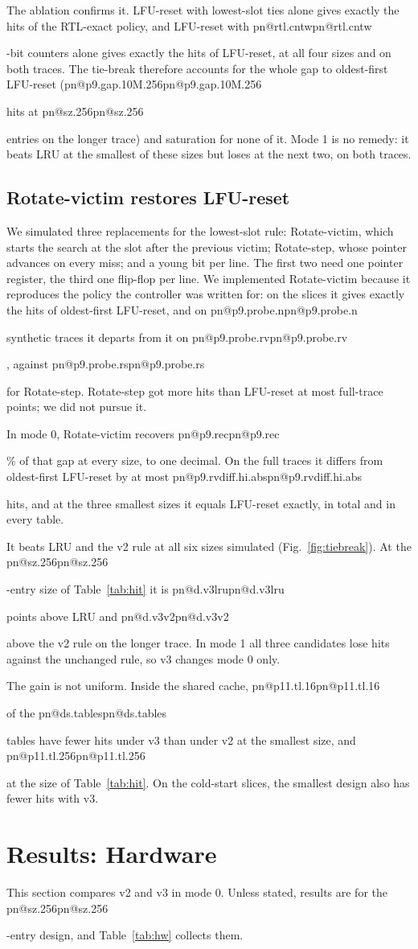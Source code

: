 \documentclass[conference,10pt]{IEEEtran}
\makeatletter
\newcommand{\R}[1]{\ifcsname pn@#1\endcsname\csname pn@#1\endcsname\else
  \PackageError{paper}{number key '#1' is not defined in macros.tex}{Run tools/make_paper_macros.py}\fi}
\makeatother
\begin{document}
The ablation confirms it. LFU-reset with lowest-slot ties alone gives exactly the hits of the RTL-exact policy, and
LFU-reset with \R{rtl.cntw}-bit counters alone gives exactly the hits of LFU-reset, at all four sizes and on both
traces. The tie-break therefore accounts for the whole gap to oldest-first LFU-reset (\R{p9.gap.10M.256} hits at \R{sz.256} entries on the
longer trace) and saturation for none of it. Mode 1 is no remedy: it beats LRU at the smallest of these sizes but
loses at the next two, on both traces.

\subsection{Rotate-victim restores LFU-reset}\label{sec:fix}
We simulated three replacements for the lowest-slot rule: Rotate-victim, which starts the search at the slot after
the previous victim; Rotate-step, whose pointer advances on every miss; and a young bit per line. The first two need
one pointer register, the third one flip-flop per line. We implemented Rotate-victim because it reproduces the policy
the controller was written for: on the slices it gives exactly the hits of oldest-first LFU-reset, and on
\R{p9.probe.n} synthetic traces it departs from it on \R{p9.probe.rv}, against \R{p9.probe.rs} for Rotate-step.
Rotate-step got more hits than LFU-reset at most full-trace points; we did not pursue it.

In mode 0, Rotate-victim recovers \R{p9.rec}\% of that gap at every size, to one decimal. On the full traces it
differs from oldest-first LFU-reset by at most \R{p9.rvdiff.hi.abs} hits, and at the three smallest sizes it equals
LFU-reset exactly, in total and in every table.

It beats LRU and the v2 rule at all six sizes simulated (Fig.~\ref{fig:tiebreak}). At the \R{sz.256}-entry size of
Table~\ref{tab:hit} it is \R{d.v3lru} points above LRU and \R{d.v3v2} above the v2 rule on the longer trace. In mode
1 all three candidates lose hits against the unchanged rule, so v3 changes mode 0 only.

The gain is not uniform. Inside the shared cache, \R{p11.tl.16} of the \R{ds.tables} tables have fewer hits under v3
than under v2 at the smallest size, and \R{p11.tl.256} at the size of Table~\ref{tab:hit}. On the cold-start slices,
the smallest design also has fewer hits with v3.

\section{Results: Hardware}\label{sec:res-hw}
This section compares v2 and v3 in mode 0. Unless stated, results are for the \R{sz.256}-entry design, and
Table~\ref{tab:hw} collects them.
\end{document}

